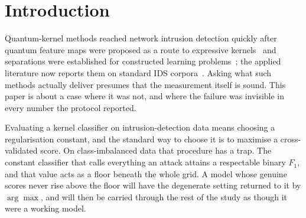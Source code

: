 \documentclass[runningheads]{llncs}
\newcommand{\Fone}{F_1}
\begin{document}
\begin{abstract}
Selecting a hyper-parameter by cross-validated $\Fone$ on class-imbalanced
data can return a model that classifies every record into one class. We
document a case in which this happened to a four-qubit quantum-kernel
intrusion detector on UNSW-NB15, produced an apparent robustness result, and
was refuted only when the regularisation constant was held fixed. We show the
mechanism and show, by census, that it is not specific to the quantum kernel.
We then measure what would have prevented it: on a denser grid the collapse
does not survive selection under any of three objectives, but for one
classical kernel every objective still returns a degenerate constant, so a
class-averaged objective is a mitigation rather than a guarantee. The one
check that identifies every case is the count of true negatives, and we
release the checks that implement it.
\end{abstract}

\section{Introduction}\label{sec:intro}

Quantum-kernel methods reached network intrusion detection quickly after
quantum feature maps were proposed as a route to expressive
kernels~\cite{havlicek2019,schuld2019hilbert} and separations were
established for constructed learning problems~\cite{liu2021speedup}; the
applied literature now reports them on standard IDS
corpora~\cite{payares2021dos,kalinin2023qids}. Asking what such methods
actually deliver presumes that the measurement itself is sound. This paper is about a case where it was not,
and where the failure was invisible in every number the protocol reported.

Evaluating a kernel classifier on intrusion-detection data means choosing a
regularisation constant, and the standard way to choose it is to maximise a
cross-validated score. On class-imbalanced data that procedure has a trap.
The constant classifier that calls everything an attack attains a
respectable binary $\Fone$, and that value acts as a floor beneath the whole
grid. A model whose genuine scores never rise above the floor will have the
degenerate setting returned to it by $\arg\max$, and will then be carried
through the rest of the study as though it were a working model.
\end{document}
